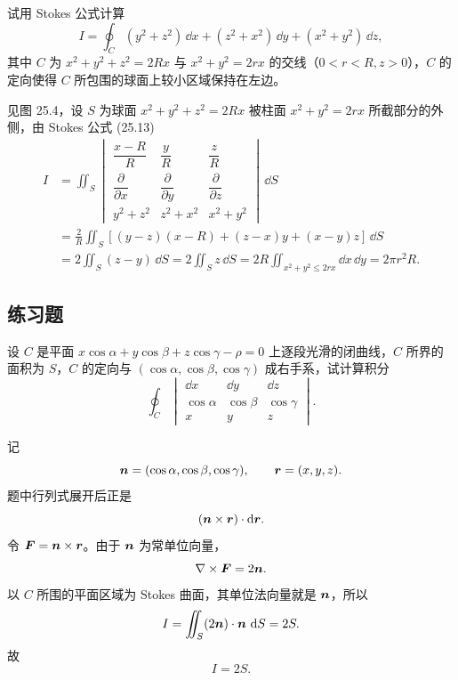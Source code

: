 \begin{xexample}[25.3.5]
试用 Stokes 公式计算
\[
  I=\oint_C(y^2+z^2)\,\dd x+(z^2+x^2)\,\dd y+(x^2+y^2)\,\dd z,
\]
其中 $C$ 为 $x^2+y^2+z^2=2Rx$ 与 $x^2+y^2=2rx$ 的交线（$0<r<R,z>0$），$C$ 的定向使得 $C$ 所包围的球面上较小区域保持在左边。
\end{xexample}

\begin{xsolution}
见图 25.4，设 $S$ 为球面 $x^2+y^2+z^2=2Rx$ 被柱面 $x^2+y^2=2rx$ 所截部分的外侧，由 Stokes 公式 (25.13)
\begin{align*}
I&=\iint_S
\begin{vmatrix}
\dfrac{x-R}{R}&\dfrac yR&\dfrac zR\\
\dfrac\partial{\partial x}&\dfrac\partial{\partial y}&\dfrac\partial{\partial z}\\
y^2+z^2&z^2+x^2&x^2+y^2
\end{vmatrix}\,\dd S\\
&=\frac2R\iint_S[(y-z)(x-R)+(z-x)y+(x-y)z]\,\dd S\\
&=2\iint_S(z-y)\,\dd S
=2\iint_S z\,\dd S
=2R\iint_{x^2+y^2\le2rx}\dd x\,\dd y
=2\pi r^2R.
\end{align*}
\end{xsolution}

\subsection{练习题}

\begin{xexercise}[1]
设 $C$ 是平面 $x\cos\alpha+y\cos\beta+z\cos\gamma-\rho=0$ 上逐段光滑的闭曲线，$C$ 所界的面积为 $S$，$C$ 的定向与 $(\cos\alpha,\cos\beta,\cos\gamma)$ 成右手系，试计算积分
\[
  \oint_C
  \begin{vmatrix}
  \dd x&\dd y&\dd z\\
  \cos\alpha&\cos\beta&\cos\gamma\\
  x&y&z
  \end{vmatrix}.
\]
\end{xexercise}
\begin{xsolution}
记
\[
  \bm{n}=(\cos\alpha,\cos\beta,\cos\gamma),
  \qquad \bm{r}=(x,y,z).
\]
题中行列式展开后正是
\[
  (\bm{n}\times\bm{r})\cdot\mathop{}\!\mathrm{d}\bm{r}.
\]
令 $\bm{F}=\bm{n}\times\bm{r}$。由于 $\bm{n}$ 为常单位向量，
\[
  \nabla\times\bm{F}=2\bm{n}.
\]
以 $C$ 所围的平面区域为 Stokes 曲面，其单位法向量就是 $\bm{n}$，所以
\[
  I=\iint_S(2\bm{n})\cdot\bm{n}\,\mathop{}\!\mathrm{d} S=2S.
\]
故
\[
  \boxed{I=2S}.
\]
\end{xsolution}


